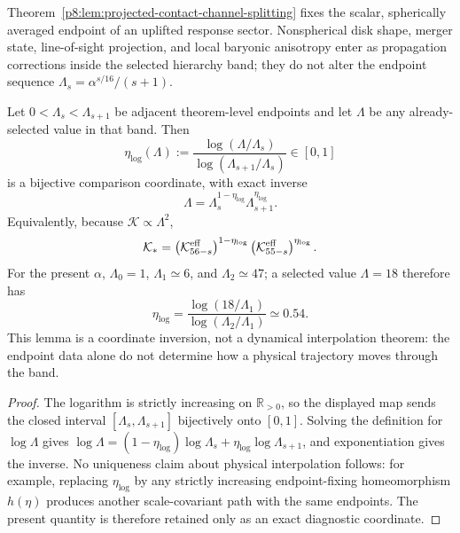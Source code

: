 \documentclass[12pt,a4paper]{article}
\begin{document}
\begin{remark}
\label{p8:rem:projected-endpoint-scope}
Theorem~\ref{p8:lem:projected-contact-channel-splitting} fixes the scalar, spherically averaged endpoint of an uplifted response sector.  Nonspherical disk shape, merger state, line-of-sight projection, and local baryonic anisotropy enter as propagation corrections inside the selected hierarchy band; they do not alter the endpoint sequence \(\Lambda_s=\alpha^{s/16}/(s+1)\).
\end{remark}

\begin{lemma}
\label{p8:lem:multiplicative-hierarchy-interpolation}
Let $0<\Lambda_s<\Lambda_{s+1}$ be adjacent theorem-level endpoints and let $\Lambda$ be any already-selected value in that band.  Then
\begin{equation}
\label{p8:eq:Lambda18-band-coordinate-general}
\eta_{\log}(\Lambda)
:=\frac{\log(\Lambda/\Lambda_s)}{\log(\Lambda_{s+1}/\Lambda_s)}
\in[0,1]
\end{equation}
is a bijective comparison coordinate, with exact inverse
\begin{equation}
\label{p8:eq:Lambda-geometric-interpolation}
\Lambda=\Lambda_s^{1-\eta_{\log}}\Lambda_{s+1}^{\eta_{\log}}.
\end{equation}
Equivalently, because $\mathcal K\propto\Lambda^2$,
\begin{equation}
\label{p8:eq:K-geometric-interpolation}
\mathcal K_*=
\left(\mathcal K_{56-s}^{\rm eff}\right)^{1-\eta_{\log}}
\left(\mathcal K_{55-s}^{\rm eff}\right)^{\eta_{\log}}.
\end{equation}
For the present $\alpha$, $\Lambda_0=1$, $\Lambda_1\simeq6$, and $\Lambda_2\simeq47$; a selected value $\Lambda=18$ therefore has
\begin{equation}
\label{p8:eq:Lambda18-band-coordinate}
\eta_{\log}=\frac{\log(18/\Lambda_1)}{\log(\Lambda_2/\Lambda_1)}\simeq0.54.
\end{equation}
This lemma is a coordinate inversion, not a dynamical interpolation theorem: the endpoint data alone do not determine how a physical trajectory moves through the band.
\end{lemma}

\begin{proof}
The logarithm is strictly increasing on $\mathbb R_{>0}$, so the displayed map sends the closed interval $[\Lambda_s,\Lambda_{s+1}]$ bijectively onto $[0,1]$.  Solving the definition for $\log\Lambda$ gives
$\log\Lambda=(1-\eta_{\log})\log\Lambda_s+\eta_{\log}\log\Lambda_{s+1}$, and exponentiation gives the inverse.  No uniqueness claim about physical interpolation follows: for example, replacing $\eta_{\log}$ by any strictly increasing endpoint-fixing homeomorphism $h(\eta)$ produces another scale-covariant path with the same endpoints.  The present quantity is therefore retained only as an exact diagnostic coordinate.
\end{proof}
\end{document}

